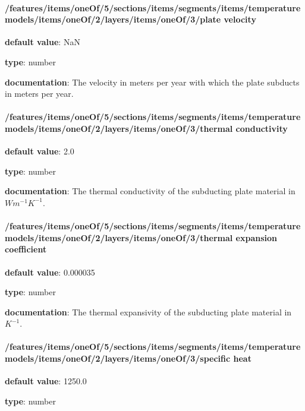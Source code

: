 \begin{itemized}
\end{itemized}\paragraph{/features/items/oneOf/5/sections/items/segments/items/temperature models/items/oneOf/2/layers/items/oneOf/3/plate velocity} \begin{itemized}
\item {\bf default value}: NaN
\item {\bf type}: number
\item {\bf documentation}: The velocity in meters per year with which the plate subducts in meters per year.
\end{itemized}\paragraph{/features/items/oneOf/5/sections/items/segments/items/temperature models/items/oneOf/2/layers/items/oneOf/3/thermal conductivity} \begin{itemized}
\item {\bf default value}: 2.0
\item {\bf type}: number
\item {\bf documentation}: The thermal conductivity of the subducting plate material in $W m^{-1} K^{-1}$.
\end{itemized}\paragraph{/features/items/oneOf/5/sections/items/segments/items/temperature models/items/oneOf/2/layers/items/oneOf/3/thermal expansion coefficient} \begin{itemized}
\item {\bf default value}: 0.000035
\item {\bf type}: number
\item {\bf documentation}: The thermal expansivity of the subducting plate material in $K^{-1}$.
\end{itemized}\paragraph{/features/items/oneOf/5/sections/items/segments/items/temperature models/items/oneOf/2/layers/items/oneOf/3/specific heat} \begin{itemized}
\item {\bf default value}: 1250.0
\item {\bf type}: number

\end{itemized}

